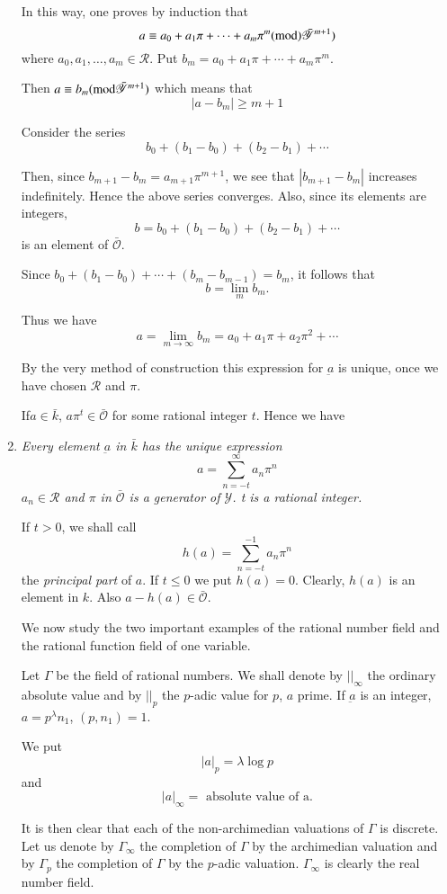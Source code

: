 \begin{enumerate}[1)]
In this way, one proves by induction that
$$
a \equiv a_0 + a_1 \pi + \cdots + a_m \pi^m ({\rm mod})
\bar{\mathscr{Y}}^{m+1}) 
$$
where $a_0 , a_1 , \ldots , a_m \in \mathscr{R} $. Put $b_m = a_0 +
a_1 \pi + \cdots + a_m \pi^m$.  

Then $a \equiv b_m ({\rm mod} \bar{\mathscr{Y}}^{m+1})$ which means that 
$$
|a - b_m| \ge m+ 1
$$
 
Consider the series
$$
b_0 +(b_1 - b_0) + (b_2 - b_1) + \cdots
$$

Then, since $b_{m+1} - b_m = a_{m+1} \pi^{m+1}$, we see that $|b_{m+1}
- b_m|$ increases indefinitely. Hence the above series
converges. Also, since its elements are integers, 
$$
b = b_0 + (b_1 - b_0) + (b_2 - b_1) + \cdots
$$
is an element of $\bar{\mathscr{O}}$.

Since $ b_0 + (b_1 - b_0) + \cdots + (b_m - b_{m-1})= b_m$, it follows
that  
$$
b = \lim_m b_m .
$$

Thus we have
$$
a = \lim_{m \to \infty} b_m = a_0 + a_1 \pi + a_2 \pi^2 + \cdots 
$$

By the very method of construction this expression for $\underbar{a}$
is unique, once we have chosen $\mathscr{R}$ and $\pi$. 

If\pageoriginale $ a \in \bar{k}$, $a \pi^t \in \bar{\mathscr{O}}$ for
some rational integer $t$. Hence we have   

\item \textit{Every element $\underbar{a}$ in $\bar{k}$ has the
  unique expression} 
$$
a = \sum_{n =- t}^{\infty} a_n \pi^n
$$
\textit{$a_n \in \mathscr{R}$ and $\pi$ in $\bar{\mathscr{O}}$ is a
  generator of $\mathscr{Y}$. t is a rational integer.} 

If $t > 0$, we shall call
$$
h(a) = \sum_{n = -t}^{ -1} a_n \pi^n
$$
the \textit{principal part} of $a$. If $t \le 0$ we put $h(a) =
0$. Clearly, $h(a)$ is an element in $k$. Also $a - h(a) \in
\bar{\mathscr{O}}$. 

We now study the two important examples of the rational number field
and the rational function field of one variable. 

Let $\Gamma$ be the field of rational numbers. We shall denote by $|
|_\infty$ the ordinary absolute value and by $| |_p$ the $p$-adic
value for $p$, $a$ prime. If $\underbar{a}$ is an integer, $a =
p^\lambda n_1$, $(p, n_1) = 1$. 

We put
$$
|a|_p = \lambda \log p
$$
and
$$
|a|_\infty = \text{ absolute value of a.}
$$

It is then clear that each of the non-archimedian valuations of
$\Gamma$ is discrete. Let us denote by $\Gamma_\infty$ the completion
of $\Gamma$ by the archimedian valuation and by $\Gamma_p$ the
completion of $\Gamma$ by the $p$-adic valuation. $\Gamma_\infty$ is
clearly the real number field. 


\end{enumerate}
